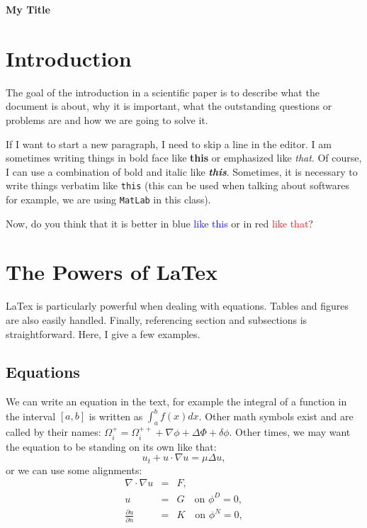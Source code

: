 \documentclass[12pt]{article}
\begin{document}
\centerline{\Large\textbf{My Title}}
\vspace{2cm}


\section{Introduction}\label{sec::Intro}
The goal of the introduction in a scientific paper is to describe what the document is about, why it is important, what the outstanding questions or problems are and how we are going to solve it.

If I want to start a new paragraph, I need to skip a line in the editor. I am sometimes writing things in bold face like \textbf{this} or emphasized like \emph{that}. Of course, I can use a combination of bold and italic like \textbf{\emph{this}}. Sometimes, it is necessary to write things verbatim like \texttt{this} (this can be used when talking about softwares for example, we are using \texttt{MatLab} in this class). 

Now, do you think that it is better in blue \textcolor{blue}{like this} or in red \textcolor{red}{like that}?


\section{The Powers of LaTex}
LaTex is particularly powerful when dealing with equations. Tables and figures are also easily handled. Finally, referencing section and subsections is straightforward. Here, I give a few examples.

\subsection{Equations}\label{sec::equation}
We can write an equation in the text, for example the integral of a function in the interval $[a, b]$ is written as $\int_a^b f(x) dx$. Other math symbols exist and are called by their names: $\Omega_i^+=\Omega_i^{++}+\nabla \phi + \Delta \Phi + \delta \phi$. Other times, we may want the equation to be standing on its own like that:
\begin{equation}
u_t + u \cdot \nabla u = \mu \Delta u, \label{eq::Navier-Stokes}
\end{equation}
or we can use some alignments:
\begin{eqnarray}
\nabla \cdot \nabla u &=& F,  \nonumber \\
u &=& G \quad \textrm{on } \phi^D = 0, \label{eq::poisson} \\
\frac{\partial u}{\partial n} &=& K \quad \textrm{on } \phi^N = 0, \nonumber
\end{eqnarray}
\end{document}
